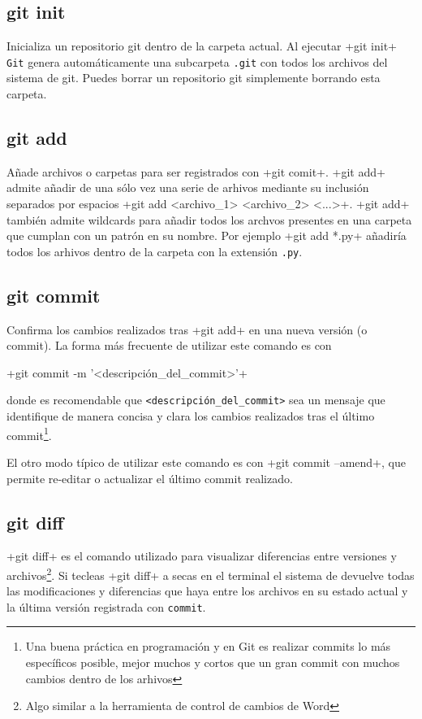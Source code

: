 \documentclass[a4paper,10pt]{article}
\begin{document}
    \subsection{git init}
      Inicializa un repositorio git dentro de la carpeta actual. Al ejecutar \cverb+git init+ \verb+Git+ genera automáticamente una subcarpeta \verb+.git+ con todos los archivos del sistema de git. Puedes borrar un repositorio git simplemente borrando esta carpeta.
      
    \subsection{git add}
      Añade archivos o carpetas para ser registrados con \cverb+git comit+. \cverb+git add+ admite añadir de una sólo vez una serie de arhivos mediante su inclusión separados por espacios \cverb+git add <archivo_1> <archivo_2> <...>+. \cverb+git add+ también admite wildcards para añadir todos los archvos presentes en una carpeta que cumplan con un patrón en su nombre. Por ejemplo \cverb+git add *.py+ añadiría todos los arhivos dentro de la carpeta con la extensión \verb+.py+.
    
    \subsection{git commit}
      Confirma los cambios realizados tras \cverb+git add+ en una nueva versión (o commit). La forma más frecuente de utilizar este comando es con
      
      \cverb+git commit -m '<descripción_del_commit>'+
      
      donde es recomendable que \verb+<descripción_del_commit>+ sea un mensaje que identifique de manera concisa y clara los cambios realizados tras el último commit\footnote{Una buena práctica en programación y en Git es realizar commits lo más específicos posible, mejor muchos y cortos que un gran commit con muchos cambios dentro de los arhivos}. 
      
      El otro modo típico de utilizar este comando es con \cverb+git commit --amend+, que permite re-editar o actualizar el último commit realizado.
      
    \subsection{git diff}
    \cverb+git diff+ es el comando utilizado para visualizar diferencias entre versiones y archivos\footnote{Algo similar a la herramienta de control de cambios de Word}. Si tecleas \cverb+git diff+ a secas en el terminal el sistema de devuelve todas las modificaciones y diferencias que haya entre los archivos en su estado actual y la última versión registrada con \verb+commit+.
    
\end{document}
